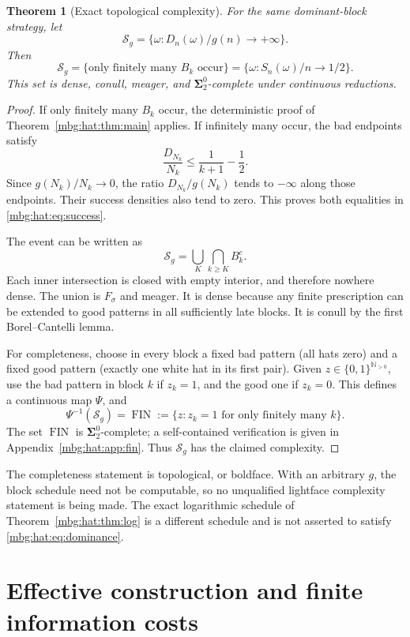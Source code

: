 \documentclass[11pt,letterpaper]{article}
\newtheorem{theorem}{Theorem}[section]
\theoremstyle{definition}
\newcommand{\N}{\mathbb N}
\newcommand{\FIN}{\operatorname{FIN}}
\begin{document}
\begin{theorem}[Exact topological complexity]\label{mbg:hat:thm:success}
For the same dominant-block strategy, let
\[
  \mathcal S_g=\{\omega:D_n(\omega)/g(n)\to+\infty\}.
\]
Then
\[
  \mathcal S_g
  =\{\text{only finitely many }B_k\text{ occur}\}
  =\{\omega:S_n(\omega)/n\to1/2\}.                        \tag{26.2}\label{mbg:hat:eq:success}
\]
This set is dense, conull, meager, and
\(\boldsymbol{\Sigma}^0_2\)-complete under continuous reductions.
\end{theorem}
\begin{proof}
If only finitely many \(B_k\) occur, the deterministic proof of
Theorem~\ref{mbg:hat:thm:main} applies. If infinitely many occur,
the bad endpoints satisfy
\[
  \frac{D_{N_k}}{N_k}\le\frac1{k+1}-\frac12.
\]
Since \(g(N_k)/N_k\to0\), the ratio \(D_{N_k}/g(N_k)\)
tends to \(-\infty\) along those endpoints. Their success densities
also tend to zero. This proves both equalities in
\eqref{mbg:hat:eq:success}.

The event can be written as
\[
  \mathcal S_g=\bigcup_K\bigcap_{k\ge K}B_k^c.
\]
Each inner intersection is closed with empty interior, and therefore
nowhere dense. The union is \(F_\sigma\) and meager. It is dense
because any finite prescription can be extended to good patterns
in all sufficiently late blocks. It is conull by the first
Borel--Cantelli lemma.

For completeness, choose in every block a fixed bad pattern
(all hats zero) and a fixed good pattern (exactly one white hat
in its first pair). Given \(z\in\{0,1\}^{\N_{>0}}\), use the bad
pattern in block \(k\) if \(z_k=1\), and the good one if \(z_k=0\).
This defines a continuous map \(\Psi\), and
\[
  \Psi^{-1}(\mathcal S_g)
  =\FIN:=\{z:z_k=1\text{ for only finitely many }k\}.
\]
The set \(\FIN\) is
\(\boldsymbol{\Sigma}^0_2\)-complete; a self-contained verification
is given in Appendix~\ref{mbg:hat:app:fin}. Thus \(\mathcal S_g\) has the
claimed complexity.
\end{proof}

The completeness statement is topological, or boldface. With an
arbitrary \(g\), the block schedule need not be computable, so no
unqualified lightface complexity statement is being made.
The exact logarithmic schedule of Theorem~\ref{mbg:hat:thm:log} is a
different schedule and is not asserted to satisfy
\eqref{mbg:hat:eq:dominance}.

\section{Effective construction and finite information costs}
\label{mbg:hat:sec:effective}
\end{document}
